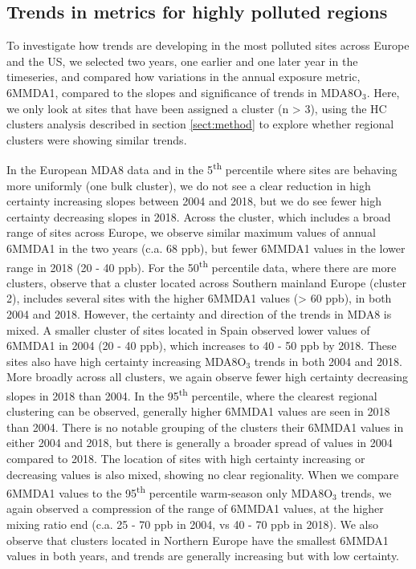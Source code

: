 \documentclass[journal abbreviation, manuscript]{copernicus}
\begin{document}
\subsection{Trends in metrics for highly polluted regions} \label{sect:polluted_stuff}

To investigate how trends are developing in the most polluted sites across Europe and the US, we selected two years, one earlier and one later year in the timeseries, and compared how variations in the annual exposure metric, 6MMDA1, compared to the slopes and significance of trends in MDA8O$_3$. Here, we only look at sites that have been assigned a cluster (n > 3), using the HC clusters analysis described in section \ref{sect:method} to explore whether regional clusters were showing similar trends. 

In the European MDA8 data and in the 5\textsuperscript{th} percentile where sites are behaving more uniformly (one bulk cluster), we do not see a clear reduction in high certainty increasing slopes between 2004 and 2018, but we do see fewer high certainty decreasing slopes in 2018. Across the cluster, which includes a broad range of sites across Europe, we observe similar maximum values of annual 6MMDA1 in the two years (c.a. 68 ppb), but fewer 6MMDA1 values in the lower range in 2018 (20 - 40 ppb). For the 50\textsuperscript{th} percentile data, where there are more clusters, observe that a cluster located across Southern mainland Europe (cluster 2), includes several sites with the higher 6MMDA1 values (> 60 ppb), in both 2004 and 2018. However, the certainty and direction of the trends in MDA8 is mixed. A smaller cluster of sites located in Spain observed lower values of 6MMDA1 in 2004 (20 - 40 ppb), which increases to 40 - 50 ppb by 2018. These sites also have high certainty increasing MDA8O$_3$ trends in both 2004 and 2018. More broadly across all clusters, we again observe fewer high certainty decreasing slopes in 2018 than 2004. In the 95\textsuperscript{th} percentile, where the clearest regional clustering can be observed, generally higher 6MMDA1 values are seen in 2018 than 2004. There is no notable grouping of the clusters their 6MMDA1 values in either 2004 and 2018, but there is generally a broader spread of values in 2004 compared to 2018. The location of sites with high certainty increasing or decreasing values is also mixed, showing no clear regionality. When we compare 6MMDA1 values to the 95\textsuperscript{th} percentile warm-season only MDA8O$_3$ trends, we again observed a compression of the range of 6MMDA1 values, at the higher mixing ratio end (c.a. 25 - 70 ppb in 2004, vs 40 - 70 ppb in 2018). We also observe that clusters located in Northern Europe have the smallest 6MMDA1 values in both years, and trends are generally increasing but with low certainty.
\end{document}
